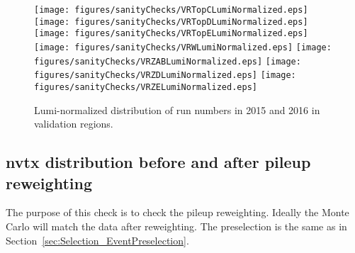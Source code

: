 \begin{figure}[htbp]
\begin{center} 
\texttt{[image: figures/sanityChecks/VRTopCLumiNormalized.eps]}
\texttt{[image: figures/sanityChecks/VRTopDLumiNormalized.eps]}
\texttt{[image: figures/sanityChecks/VRTopELumiNormalized.eps]}
\texttt{[image: figures/sanityChecks/VRWLumiNormalized.eps]}
\texttt{[image: figures/sanityChecks/VRZABLumiNormalized.eps]}
\texttt{[image: figures/sanityChecks/VRZDLumiNormalized.eps]}
\texttt{[image: figures/sanityChecks/VRZELumiNormalized.eps]}
\caption{Lumi-normalized distribution of run numbers in 2015 and 2016 in validation regions.}
\label{fig:Fit2ele}
\end{center}
\end{figure}


\newpage


\subsection{nvtx distribution before and after pileup reweighting}

The purpose of this check is to check the pileup reweighting.  Ideally the Monte Carlo will match the data after reweighting.  The preselection is the same as in Section~\ref{sec:Selection_EventPreselection}.%

